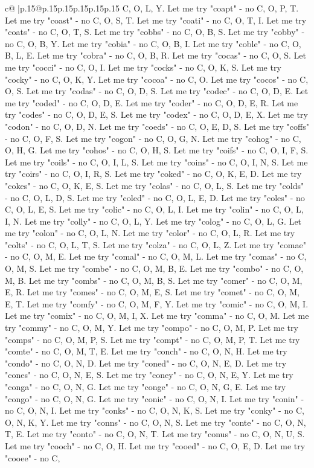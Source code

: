 \documentclass{article}
\begin{document}
{\begin{supertabular}{c@{$\;$}|p{.15\linewidth}@{}p{.15\linewidth}p{.15\linewidth}p{.15\linewidth}p{.15\linewidth}p{.15\linewidth}}
{{{C, O, L, Y. Let me try "coapt" {-} no C, O, P, T. Let me try "coast" {-} no C, O, S, T. Let me try "coati" {-} no C, O, T, I. Let me try "coats" {-} no C, O, T, S. Let me try "cobbs" {-} no C, O, B, S. Let me try "cobby" {-} no C, O, B, Y. Let me try "cobia" {-} no C, O, B, I. Let me try "coble" {-} no C, O, B, L, E. Let me try "cobra" {-} no C, O, B, R. Let me try "cocas" {-} no C, O, S. Let me try "cocci" {-} no C, O, I. Let me try "cocks" {-} no C, O, K, S. Let me try "cocky" {-} no C, O, K, Y. Let me try "cocoa" {-} no C, O. Let me try "cocos" {-} no C, O, S. Let me try "codas" {-} no C, O, D, S. Let me try "codec" {-} no C, O, D, E. Let me try "coded" {-} no C, O, D, E. Let me try "coder" {-} no C, O, D, E, R. Let me try "codes" {-} no C, O, D, E, S. Let me try "codex" {-} no C, O, D, E, X. Let me try "codon" {-} no C, O, D, N. Let me try "coeds" {-} no C, O, E, D, S. Let me try "coffs" {-} no C, O, F, S. Let me try "cogon" {-} no C, O, G, N. Let me try "cohog" {-} no C, O, H, G. Let me try "cohos" {-} no C, O, H, S. Let me try "coifs" {-} no C, O, I, F, S. Let me try "coils" {-} no C, O, I, L, S. Let me try "coins" {-} no C, O, I, N, S. Let me try "coirs" {-} no C, O, I, R, S. Let me try "coked" {-} no C, O, K, E, D. Let me try "cokes" {-} no C, O, K, E, S. Let me try "colas" {-} no C, O, L, S. Let me try "colds" {-} no C, O, L, D, S. Let me try "coled" {-} no C, O, L, E, D. Let me try "coles" {-} no C, O, L, E, S. Let me try "colic" {-} no C, O, L, I. Let me try "colin" {-} no C, O, L, I, N. Let me try "colly" {-} no C, O, L, Y. Let me try "colog" {-} no C, O, L, G. Let me try "colon" {-} no C, O, L, N. Let me try "color" {-} no C, O, L, R. Let me try "colts" {-} no C, O, L, T, S. Let me try "colza" {-} no C, O, L, Z. Let me try "comae" {-} no C, O, M, E. Let me try "comal" {-} no C, O, M, L. Let me try "comas" {-} no C, O, M, S. Let me try "combe" {-} no C, O, M, B, E. Let me try "combo" {-} no C, O, M, B. Let me try "combs" {-} no C, O, M, B, S. Let me try "comer" {-} no C, O, M, E, R. Let me try "comes" {-} no C, O, M, E, S. Let me try "comet" {-} no C, O, M, E, T. Let me try "comfy" {-} no C, O, M, F, Y. Let me try "comic" {-} no C, O, M, I. Let me try "comix" {-} no C, O, M, I, X. Let me try "comma" {-} no C, O, M. Let me try "commy" {-} no C, O, M, Y. Let me try "compo" {-} no C, O, M, P. Let me try "comps" {-} no C, O, M, P, S. Let me try "compt" {-} no C, O, M, P, T. Let me try "comte" {-} no C, O, M, T, E. Let me try "conch" {-} no C, O, N, H. Let me try "condo" {-} no C, O, N, D. Let me try "coned" {-} no C, O, N, E, D. Let me try "cones" {-} no C, O, N, E, S. Let me try "coney" {-} no C, O, N, E, Y. Let me try "conga" {-} no C, O, N, G. Let me try "conge" {-} no C, O, N, G, E. Let me try "congo" {-} no C, O, N, G. Let me try "conic" {-} no C, O, N, I. Let me try "conin" {-} no C, O, N, I. Let me try "conks" {-} no C, O, N, K, S. Let me try "conky" {-} no C, O, N, K, Y. Let me try "conns" {-} no C, O, N, S. Let me try "conte" {-} no C, O, N, T, E. Let me try "conto" {-} no C, O, N, T. Let me try "conus" {-} no C, O, N, U, S. Let me try "cooch" {-} no C, O, H. Let me try "cooed" {-} no C, O, E, D. Let me try "cooee" {-} no C, }}}
\end{supertabular}}
\end{document}
